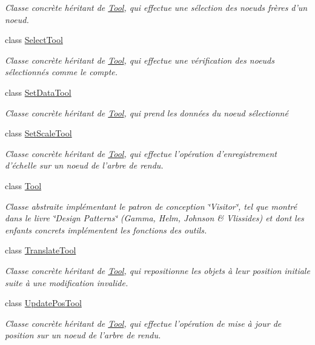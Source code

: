 \begin{DoxyCompactItemize}
\begin{DoxyCompactList}\small\item\em Classe concrète héritant de \hyperlink{class_tool}{Tool}, qui effectue une sélection des noeuds frères d'un noeud. \end{DoxyCompactList}\item 
class \hyperlink{class_select_tool}{Select\-Tool}
\begin{DoxyCompactList}\small\item\em Classe concrète héritant de \hyperlink{class_tool}{Tool}, qui effectue une vérification des noeuds sélectionnés comme le compte. \end{DoxyCompactList}\item 
class \hyperlink{class_set_data_tool}{Set\-Data\-Tool}
\begin{DoxyCompactList}\small\item\em Classe concrète héritant de \hyperlink{class_tool}{Tool}, qui prend les données du noeud sélectionné \end{DoxyCompactList}\item 
class \hyperlink{class_set_scale_tool}{Set\-Scale\-Tool}
\begin{DoxyCompactList}\small\item\em Classe concrète héritant de \hyperlink{class_tool}{Tool}, qui effectue l'opération d'enregistrement d'échelle sur un noeud de l'arbre de rendu. \end{DoxyCompactList}\item 
class \hyperlink{class_tool}{Tool}
\begin{DoxyCompactList}\small\item\em Classe abstraite implémentant le patron de conception \char`\"{}\-Visitor\char`\"{}, tel que montré dans le livre \char`\"{}\-Design Patterns\char`\"{} (Gamma, Helm, Johnson \& Vlissides) et dont les enfants concrets implémentent les fonctions des outils. \end{DoxyCompactList}\item 
class \hyperlink{class_translate_tool}{Translate\-Tool}
\begin{DoxyCompactList}\small\item\em Classe concrète héritant de \hyperlink{class_tool}{Tool}, qui repositionne les objets à leur position initiale suite à une modification invalide. \end{DoxyCompactList}\item 
class \hyperlink{class_update_pos_tool}{Update\-Pos\-Tool}
\begin{DoxyCompactList}\small\item\em Classe concrète héritant de \hyperlink{class_tool}{Tool}, qui effectue l'opération de mise à jour de position sur un noeud de l'arbre de rendu. \end{DoxyCompactList}\item 

\end{DoxyCompactItemize}
